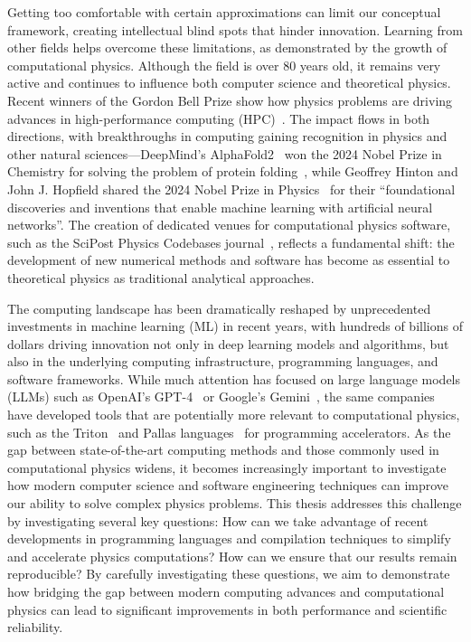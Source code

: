 Getting too comfortable with certain approximations can limit our conceptual framework, creating intellectual blind spots that hinder innovation. Learning from other fields helps overcome these limitations, as demonstrated by the growth of computational physics. Although the field is over 80 years old, it remains very active and continues to influence both computer science and theoretical physics. Recent winners of the Gordon Bell Prize show how physics problems are driving advances in high-performance computing (HPC)~\cite{Stocks_2024_Breaking_the_Mi,Das_S_2023_Large_Scale_Mat,Fedeli_2022_Pushing_the_Fro,Liu_Y_2021_Closing_the_qu}. The impact flows in both directions, with breakthroughs in computing gaining recognition in physics and other natural sciences---DeepMind's AlphaFold2~\cite{Jumper_2021_Highly_accurate} won the 2024 Nobel Prize in Chemistry for solving the problem of protein folding~, while Geoffrey Hinton and John J. Hopfield shared the 2024 Nobel Prize in Physics~ for their ``foundational discoveries and inventions that enable machine learning with artificial neural networks''. The creation of dedicated venues for computational physics software, such as the SciPost Physics Codebases journal~, reflects a fundamental shift: the development of new numerical methods and software has become as essential to theoretical physics as traditional analytical approaches.

The computing landscape has been dramatically reshaped by unprecedented investments in machine learning (ML) in recent years, with hundreds of billions of dollars driving innovation not only in deep learning models and algorithms, but also in the underlying computing infrastructure, programming languages, and software frameworks. While much attention has focused on large language models (LLMs) such as OpenAI's GPT-4~\cite{OpenAI_2023_GPT_4_Technical} or Google's Gemini~\cite{Team_2023_Gemini_A_Famil}, the same companies have developed tools that are potentially more relevant to computational physics, such as the Triton~\cite{Tillet_2019_Triton_an_inte} and Pallas languages~ for programming accelerators. As the gap between state-of-the-art computing methods and those commonly used in computational physics widens, it becomes increasingly important to investigate how modern computer science and software engineering techniques can improve our ability to solve complex physics problems. This thesis addresses this challenge by investigating several key questions: How can we take advantage of recent developments in programming languages and compilation techniques to simplify and accelerate physics computations? How can we ensure that our results remain reproducible? By carefully investigating these questions, we aim to demonstrate how bridging the gap between modern computing advances and computational physics can lead to significant improvements in both performance and scientific reliability.

